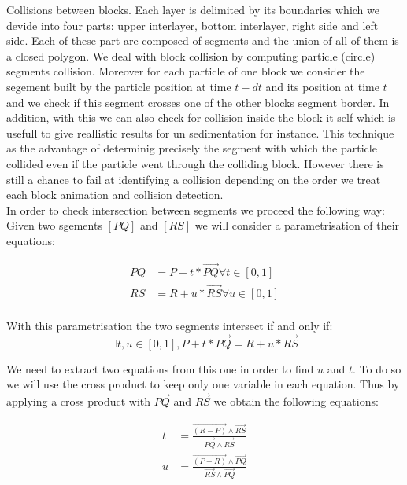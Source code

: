 \documentclass[12pt, a4paper]{memoir} %
\begin{document}
Collisions between blocks. Each layer is delimited by its boundaries which we devide into four parts: upper interlayer, bottom interlayer, right side and left side. Each of these part are composed of segments and the union of all of them is a closed polygon. We deal with block collision by computing particle (circle) segments collision. Moreover for each particle of one block we consider the segement built by the particle position at time $t - dt$ and its position at time $t$ and we check if this segment crosses one of the other blocks segment border. In addition, with this we can also check for collision inside the block it self which is usefull to give reallistic results for un sedimentation for instance. This technique as the advantage of determinig precisely the segment with which the particle collided even if the particle went through the colliding block. However there is still a chance to fail at identifying a collision depending on the order we treat each block animation and collision detection.\\
In order to check intersection between segments we proceed the following way:\\
Given two sgements $[PQ]$ and $[RS]$ we will consider a parametrisation of their equations: 

\begin{align}
	PQ &= P + t*\overrightarrow{PQ} \forall t \in [0,1]\\
	RS &= R + u*\overrightarrow{RS} \forall u \in [0,1]\\
\end{align}

With this parametrisation the two segments intersect if and only if:\\
\begin{equation}
\exists t,u \in [0,1], P + t*\overrightarrow{PQ} = R + u*\overrightarrow{RS}
\end{equation}


We need to extract two equations from this one in order to find $u$ and $t$.
To do so we will use the cross product to keep only one variable in each equation. Thus by applying a cross product with $\overrightarrow{PQ}$ and $\overrightarrow{RS}$ we obtain the following equations:


\begin{align}
	t &= \frac{\overrightarrow{(R - P)} \wedge \overrightarrow{RS}}{\overrightarrow{PQ} \wedge \overrightarrow{RS}}\\
	u &= \frac{\overrightarrow{(P - R)} \wedge \overrightarrow{PQ}}{\overrightarrow{RS} \wedge \overrightarrow{PQ}}
\end{align}
\end{document}
